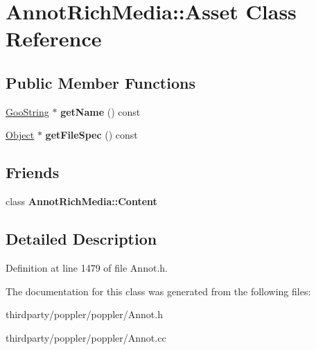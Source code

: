\hypertarget{class_annot_rich_media_1_1_asset}{}\section{Annot\+Rich\+Media\+:\+:Asset Class Reference}
\label{class_annot_rich_media_1_1_asset}
\subsection*{Public Member Functions}
\begin{DoxyCompactItemize}
\item 
\mbox{\label{class_annot_rich_media_1_1_asset_aac4523ddf2625941860050d6ea163483}} 
\hyperlink{class_goo_string}{Goo\+String} $\ast$ {\bfseries get\+Name} () const
\item 
\mbox{\label{class_annot_rich_media_1_1_asset_a54bc6929d389eb5f50217fceede3e6e8}} 
\hyperlink{class_object}{Object} $\ast$ {\bfseries get\+File\+Spec} () const
\end{DoxyCompactItemize}
\subsection*{Friends}
\begin{DoxyCompactItemize}
\item 
\mbox{\label{class_annot_rich_media_1_1_asset_a99ad3a75f70e10fbebb88e339450f162}} 
class {\bfseries Annot\+Rich\+Media\+::\+Content}
\end{DoxyCompactItemize}


\subsection{Detailed Description}


Definition at line 1479 of file Annot.\+h.



The documentation for this class was generated from the following files\+:\begin{DoxyCompactItemize}
\item 
thirdparty/poppler/poppler/Annot.\+h\item 
thirdparty/poppler/poppler/Annot.\+cc\end{DoxyCompactItemize}
